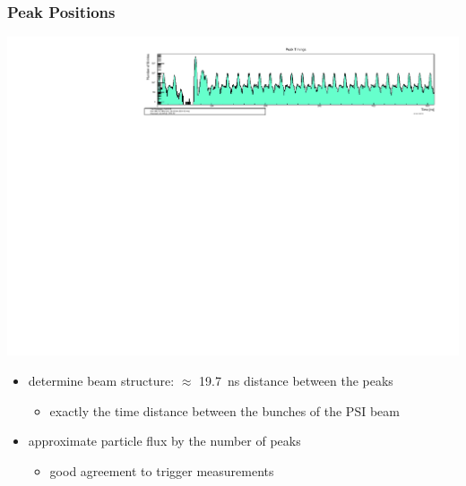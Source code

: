 \documentclass[9pt]{beamer}
\begin{document}
\begin{frame}
	\frametitle{Peak Positions}
	\begin{center}
		\includegraphics[angle=270, width=.8\textwidth]{PeakTimings}\\
	\end{center}
	\begin{itemize}
		\item determine beam structure: $\approx$ \SI{19.7}{ns} distance between the peaks
		\begin{itemize}
			\item exactly the time distance between the bunches of the PSI beam
		\end{itemize}
		\item approximate particle flux by the number of peaks
		\begin{itemize}
			\item good agreement to trigger measurements
		\end{itemize}
	\end{itemize}

\end{frame}
\end{document}
